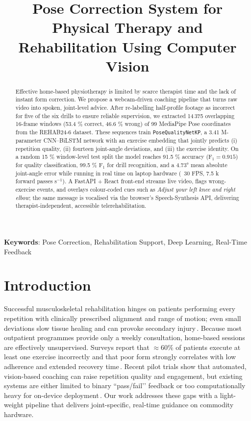 \documentclass{article}
\title{Pose Correction System for Physical Therapy and Rehabilitation Using Computer Vision}
\begin{document}
\maketitle

\begin{abstract}

Effective home-based physiotherapy is limited by scarce therapist time and the lack of instant form correction. We propose a webcam-driven coaching pipeline that turns raw video into spoken, joint-level advice.  
After re-labelling half-profile footage as incorrect for five of the six drills to ensure reliable supervision, we extracted 14\,375 overlapping 16-frame windows (53.4 \% correct, 46.6 \% wrong) of 99 MediaPipe Pose coordinates from the REHAB24-6 dataset.  These sequences train \texttt{PoseQualityNetKP}, a 3.41 M-parameter CNN–BiLSTM network with an exercise embedding that jointly predicts (i) repetition quality, (ii) fourteen joint-angle deviations, and (iii) the exercise identity.  On a random 15 \% window-level test split the model reaches 91.5 \% accuracy (F\(_1=0.915\)) for quality classification, 99.5 \% F\(_1\) for drill recognition, and a 4.73° mean absolute joint-angle error while running in real time on laptop hardware (~30 FPS, 7.5 k forward passes s\(^{-1}\)).  A FastAPI + React front-end streams live video, flags wrong-exercise events, and overlays colour-coded cues such as \emph{Adjust your left knee and right elbow}; the same message is vocalised via the browser’s Speech-Synthesis API, delivering therapist-independent, accessible telerehabilitation.

\end{abstract}
%

\textbf{Keywords}: Pose Correction, Rehabilitation Support, Deep Learning, Real-Time Feedback


\section{Introduction}
\label{sec:intro}

Successful musculoskeletal rehabilitation hinges on patients performing every repetition with clinically prescribed alignment and range of motion; even small deviations slow tissue healing and can provoke secondary injury\,\cite{Widhalm2024}.  Because most outpatient programmes provide only a weekly consultation, home-based sessions are effectively unsupervised.  Surveys report that \(\approx 60\%\) of patients execute at least one exercise incorrectly and that poor form strongly correlates with low adherence and extended recovery time\,\cite{Xing2025,Velez2023}.  Recent pilot trials show that automated, vision-based coaching can raise repetition quality and engagement, but existing systems are either limited to binary “pass/fail’’ feedback or too computationally heavy for on-device deployment\,\cite{Abedi2024}.  Our work addresses these gaps with a light-weight pipeline that delivers joint-specific, real-time guidance on commodity hardware.
\end{document}
